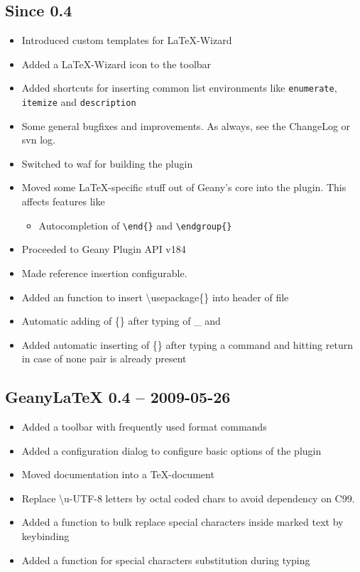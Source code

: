 \documentclass[%
paper=a4,%
fontsize=11pt,%
twoside=false,%
DIV18,
headsepline,
plainheadsepline,
footsepline,
plainfootsepline,
bibliography=totoc,%
listof=totoc,%
BCOR10mm,%
parskip=half,%
openany,%
]{scrartcl}
\begin{document}
\subsection*{Since 0.4}
\begin{itemize}

	\item Introduced custom templates for \LaTeX-Wizard
	\item Added a \LaTeX-Wizard icon to the toolbar
	\item Added shortcuts for inserting common list environments
		  like \texttt{enumerate}, \texttt{itemize} and
		  \texttt{description}
	\item Some general bugfixes and improvements. As always, see the
		  ChangeLog or svn log.
	\item Switched to waf for building the plugin
	\item Moved some \LaTeX{}-specific stuff out of Geany's core into the
		  plugin. This affects features like
			\begin{itemize}
				\item Autocompletion of \texttt{\textbackslash{}end\{\}}
					and \texttt{\textbackslash{}endgroup\{\}}
			\end{itemize}
	\item Proceeded to Geany Plugin API v184
	\item Made reference insertion configurable.
	\item Added an function to insert \textbackslash{}usepackage\{\} into
		  header of file
	\item Automatic adding of \{\} after typing of \_{} and 
	\item Added automatic inserting of \{\} after typing a command and
		  hitting return in case of none pair is already present
\end{itemize}

\subsection*{GeanyLaTeX{} 0.4 -- 2009-05-26}
\begin{itemize}
	\item Added a toolbar with frequently used format commands
	\item Added a configuration dialog to configure basic options
          of the plugin
	\item Moved documentation into a \TeX{}-document
	\item Replace \textbackslash{}u-UTF-8 letters by octal coded
          chars to avoid dependency on C99.
	\item Added a function to bulk replace special characters
          inside marked text by keybinding
	\item Added a function for special characters substitution during typing
\end{itemize}
\end{document}
